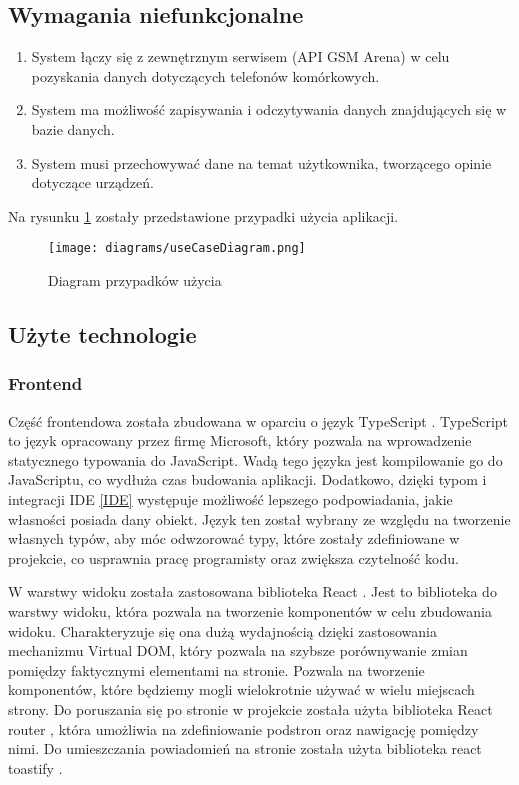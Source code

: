 \subsection{Wymagania niefunkcjonalne}
\begin{enumerate}
    \item System łączy się z zewnętrznym serwisem (API GSM Arena) w celu pozyskania danych dotyczących telefonów komórkowych.
    \item System ma możliwość zapisywania i odczytywania danych znajdujących się w bazie danych.
    \item System musi przechowywać dane na temat użytkownika, tworzącego opinie dotyczące urządzeń.
\end{enumerate}

\newpage
Na rysunku \ref*{use_case} zostały przedstawione przypadki użycia aplikacji.
\begin{figure}[H]
    \centering
    \texttt{[image: diagrams/useCaseDiagram.png]}
    \caption{Diagram przypadków użycia}
    \label{use_case}
\end{figure}

\subsection{Użyte technologie}
\subsubsection{Frontend}
Część frontendowa została zbudowana w oparciu o język TypeScript \cite{TypeScript}. TypeScript to język opracowany przez firmę Microsoft, który pozwala na wprowadzenie statycznego typowania do JavaScript. Wadą tego języka jest kompilowanie go do JavaScriptu, co wydłuża czas budowania aplikacji. Dodatkowo, dzięki typom i integracji IDE \ref{IDE} występuje możliwość lepszego podpowiadania, jakie własności posiada dany obiekt.
Język ten został wybrany ze względu na tworzenie własnych typów, aby móc odwzorować typy, które zostały zdefiniowane w projekcie, co usprawnia pracę programisty oraz zwiększa czytelność kodu. 

W warstwy widoku została zastosowana biblioteka React \cite{React}. Jest to biblioteka do warstwy widoku, która pozwala na tworzenie komponentów w celu zbudowania widoku. Charakteryzuje się ona dużą wydajnością dzięki zastosowania mechanizmu Virtual DOM, który pozwala na szybsze porównywanie zmian pomiędzy faktycznymi elementami na stronie. Pozwala na tworzenie komponentów, które będziemy mogli wielokrotnie używać w wielu miejscach strony. Do poruszania się po stronie w projekcie została użyta biblioteka React router \cite{react_router}, która umożliwia na zdefiniowanie podstron oraz nawigację pomiędzy nimi. Do umieszczania powiadomień na stronie została użyta biblioteka react toastify \cite{react_toastify}.

